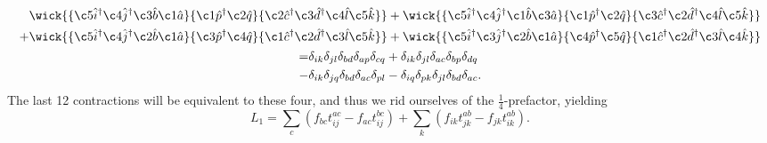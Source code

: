 \begin{gather}
    \begin{aligned}
        &\wick{
        \{\c5{\hat{i}}^\dagger \c4{\hat{j}}^\dagger \c3{\hat{b}} \c1{\hat{a}} \}
        \{\c1{\hat{p}}^\dagger \c2{\hat{q}}\} 
        \{\c2{\hat{c}}^\dagger \c3{\hat{d}}^\dagger \c4{\hat{l}} \c5{\hat{k}} \} 
        } + 
        \wick{
        \{\c5{\hat{i}}^\dagger \c4{\hat{j}}^\dagger \c1{\hat{b}} \c3{\hat{a}} \}
        \{\c1{\hat{p}}^\dagger \c2{\hat{q}}\} 
        \{\c3{\hat{c}}^\dagger \c2{\hat{d}}^\dagger \c4{\hat{l}} \c5{\hat{k}} \} 
        } \\ +
        &\wick{
        \{\c5{\hat{i}}^\dagger \c4{\hat{j}}^\dagger \c2{\hat{b}} \c1{\hat{a}} \}
        \{\c3{\hat{p}}^\dagger \c4{\hat{q}}\} 
        \{\c1{\hat{c}}^\dagger \c2{\hat{d}}^\dagger \c3{\hat{l}} \c5{\hat{k}} \} 
        } +
        \wick{
        \{\c5{\hat{i}}^\dagger \c3{\hat{j}}^\dagger \c2{\hat{b}} \c1{\hat{a}} \}
        \{\c4{\hat{p}}^\dagger \c5{\hat{q}}\} 
        \{\c1{\hat{c}}^\dagger \c2{\hat{d}}^\dagger \c3{\hat{l}} \c4{\hat{k}} \} 
        }
    \end{aligned} \\
    \begin{aligned}
         =&\delta_{ik}\delta_{jl}\delta_{bd}\delta_{ap}\delta_{cq}
         +\delta_{ik}\delta_{jl}\delta_{ac}\delta_{bp}\delta_{dq} \\
         -&\delta_{ik}\delta_{jq}\delta_{bd}\delta_{ac}\delta_{pl}
         -\delta_{iq}\delta_{pk}\delta_{jl}\delta_{bd}\delta_{ac}.
    \end{aligned}
\end{gather}
The last 12 contractions will be equivalent to these four, and thus we rid ourselves
of the $\frac{1}{4}$-prefactor, yielding
\begin{equation}
    L_1 = \sum_c(f_{bc} t^{ac}_{ij} - f_{ac} t^{bc}_{ij}) + \sum_k (f_{ik} t^{ab}_{jk} - f_{jk} t^{ab}_{ik}).
\end{equation}

